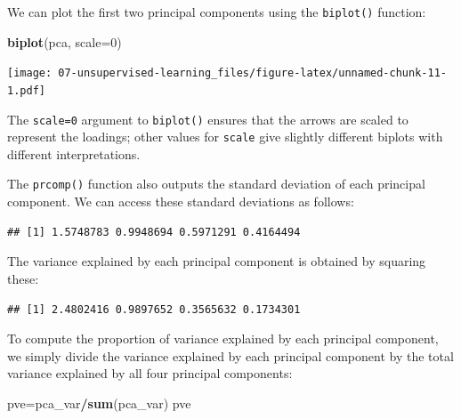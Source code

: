 \documentclass[openany]{book}
\newenvironment{Shaded}{\begin{snugshade}}{\end{snugshade}}
\newcommand{\DataTypeTok}[1]{\textcolor[rgb]{0.13,0.29,0.53}{#1}}
\newcommand{\DecValTok}[1]{\textcolor[rgb]{0.00,0.00,0.81}{#1}}
\newcommand{\KeywordTok}[1]{\textcolor[rgb]{0.13,0.29,0.53}{\textbf{#1}}}
\newcommand{\NormalTok}[1]{#1}
\newcommand{\OperatorTok}[1]{\textcolor[rgb]{0.81,0.36,0.00}{\textbf{#1}}}
\begin{document}
We can plot the first two principal components using the \texttt{biplot()} function:

\begin{Shaded}
\begin{Highlighting}[]
\KeywordTok{biplot}\NormalTok{(pca, }\DataTypeTok{scale=}\DecValTok{0}\NormalTok{)}
\end{Highlighting}
\end{Shaded}

\texttt{[image: 07-unsupervised-learning\_files/figure-latex/unnamed-chunk-11-1.pdf]}

The \texttt{scale=0} argument to \texttt{biplot()} ensures that the arrows are scaled to
represent the loadings; other values for \texttt{scale} give slightly different biplots
with different interpretations.

The \texttt{prcomp()} function also outputs the standard deviation of each principal
component. We can access these standard deviations as follows:

\begin{Shaded}
\end{Shaded}

\begin{verbatim}
## [1] 1.5748783 0.9948694 0.5971291 0.4164494
\end{verbatim}

The variance explained by each principal component is obtained by squaring
these:

\begin{Shaded}
\end{Shaded}

\begin{verbatim}
## [1] 2.4802416 0.9897652 0.3565632 0.1734301
\end{verbatim}

To compute the proportion of variance explained by each principal component,
we simply divide the variance explained by each principal component
by the total variance explained by all four principal components:

\begin{Shaded}
\begin{Highlighting}[]
\NormalTok{pve=pca_var}\OperatorTok{/}\KeywordTok{sum}\NormalTok{(pca_var)}
\NormalTok{pve}
\end{Highlighting}
\end{Shaded}
\end{document}
